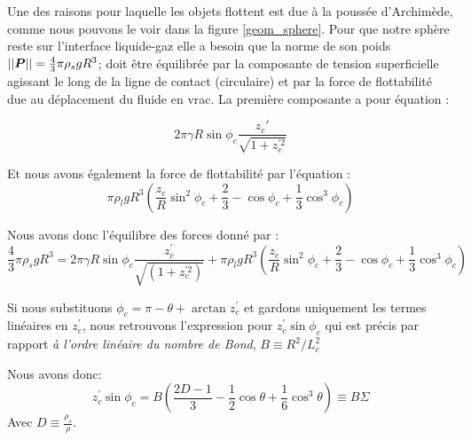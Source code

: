     Une des raisons pour laquelle les objets flottent est due à la poussée d'Archimède, comme nous pouvons le voir dans la figure \ref{geom_sphere}. Pour que notre sphère reste sur l'interface liquide-gaz elle a besoin que la norme de son poids \(||\vb*{P}||=\frac{4}{3}\pi\rho_{s}gR^3\); doit être équilibrée par la composante de tension superficielle agissant le long de la ligne de contact (circulaire) et par la force de flottabilité due au déplacement du fluide en vrac. La première composante a pour équation :

    \begin{equation}
        2\pi\gamma R\sin{\phi_c}\frac{z_c'}{\sqrt{1+z_c^{'2}}}
        \label{eq:tensionSuperficielle}
    \end{equation}

    Et nous avons également la force de flottabilité par l'équation :
    \begin{equation}
        \pi\rho_l g R^3 \left(\frac{z_c}{R}\sin^2{\phi_c} + \frac{2}{3}-\cos{\phi_c}+\frac{1}{3}\cos^3{\phi_c}\right)
        \label{eq:buoyancyForce}
    \end{equation}


    Nous avons donc l'équilibre des forces donné par :
    \begin{equation}
        \frac{4}{3}\pi\rho_{s}gR^3 =2\pi\gamma R \sin\phi_c \frac{z_c^{'}}{\sqrt{(1+z_c^{'2})}} + \pi\rho_l g R^3 \left(\frac{z_c}{R}\sin^2 \phi_c + \frac{2}{3}-\cos\phi_c+\frac{1}{3}\cos^3 \phi_c\right)
        \label{eq:BalanceOfForces}
    \end{equation}


    Si nous substituons \(\phi_c = \pi - \theta + \arctan z_c^{'}\) et gardons uniquement les termes linéaires en \(z_c^{'}\), nous retrouvons l'expression pour \(z_c^{'}\sin \phi_c\) qui est précis par rapport \textit{à l'ordre linéaire du nombre de Bond}, \(B \equiv R^2/L_c^2\) 

    Nous avons donc:
    \begin{equation}
        z_c^{'}\sin \phi_c = B\left(\frac{2D-1}{3}-\frac{1}{2}\cos \theta + \frac{1}{6} \cos^3 \theta\right) \equiv B\Sigma
        \label{eq:bondsigma}
    \end{equation}
    Avec \(D \equiv \frac{\rho_s}{\rho}\).
    
